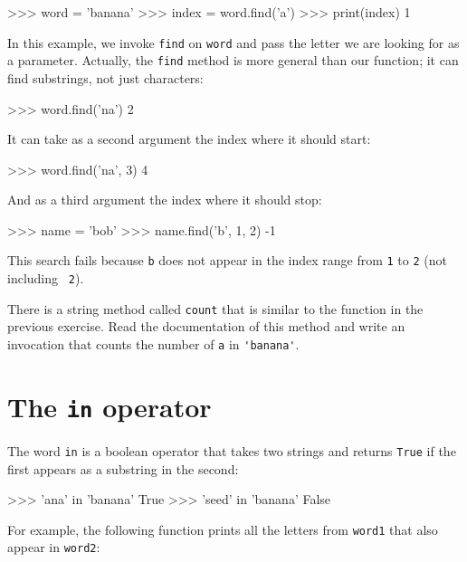 \beforeverb
\begin{pycode}
>>> word = 'banana'
>>> index = word.find('a')
>>> print(index)
1
\end{pycode}
\afterverb
%
In this example, we invoke {\tt find} on {\tt word} and pass
the letter we are looking for as a parameter.
%
Actually, the {\tt find} method is more general than our function;
it can find substrings, not just characters:

\beforeverb
\begin{pycode}
>>> word.find('na')
2
\end{pycode}
\afterverb
%
It can take as a second argument the index where it should start:


\beforeverb
\begin{pycode}
>>> word.find('na', 3)
4
\end{pycode}
\afterverb
%
And as a third argument the index where it should stop:

\beforeverb
\begin{pycode}
>>> name = 'bob'
>>> name.find('b', 1, 2)
-1
\end{pycode}
\afterverb
%
This search fails because {\tt b} does not
appear in the index range from {\tt 1} to {\tt 2} (not including {\tt
2}).


\begin{exercise}

There is a string method called {\tt count} that is similar
to the function in the previous exercise.  Read the documentation
of this method
and write an invocation that counts the number of {\tt a}
in \verb"'banana'".
\end{exercise}


\section{The {\tt in} operator}
\label{inboth}


The word {\tt in} is a boolean operator that takes two strings and
returns {\tt True} if the first appears as a substring in the second:

\beforeverb
\begin{pycode}
>>> 'ana' in 'banana'
True
>>> 'seed' in 'banana'
False
\end{pycode}
\afterverb
%
For example, the following function prints all the
letters from {\tt word1} that also appear in {\tt word2}:

